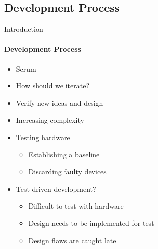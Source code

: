 \subsection{Development Process}
\begin{frame}[t]{Introduction}\framesubtitle{Development Process}
    \begin{itemize}
        \item<1-> Scrum
        \item<1-> How should we iterate?
        \item<2-> Verify new ideas and design
        \item<2-> Increasing complexity
        \item<3-> Testing hardware
            \begin{itemize}
                \item Establishing a baseline
                \item Discarding faulty devices
            \end{itemize}
        \item<4-> Test driven development?
        \begin{itemize}
            \item Difficult to test with hardware
            \item Design needs to be implemented for test
            \item Design flaws are caught late
        \end{itemize}
    \end{itemize}
\end{frame}

